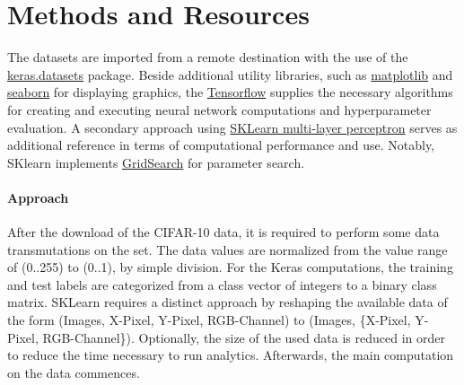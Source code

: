 \chapter{Methods and Resources}
The datasets are imported from a remote destination with the use of the \href{https://keras.io/api/datasets/cifar10/}{keras.datasets} package.
Beside additional utility libraries, such as \href{https://matplotlib.org/}{matplotlib} and \href{https://seaborn.pydata.org/}{seaborn} for displaying graphics, the \href{https://www.tensorflow.org/}{Tensorflow} supplies the necessary algorithms for creating and executing neural network computations and hyperparameter evaluation.
A secondary approach using \href{https://scikit-learn.org/stable/modules/generated/sklearn.neural_network.MLPClassifier.html}{SKLearn multi-layer perceptron} serves as additional reference in terms of computational performance and use. Notably, SKlearn implements \href{https://scikit-learn.org/stable/modules/generated/sklearn.model_selection.GridSearchCV.html}{GridSearch} for parameter search.

\subsubsection{Approach}
After the download of the CIFAR-10 data, it is required to perform some data transmutations on the set.
The data values are normalized from the value range of (0..255) to (0..1), by simple division. 
For the Keras computations, the training and test labels are categorized from a class vector of integers to a binary class matrix.
SKLearn requires a distinct approach by reshaping the available data of the form (Images, X-Pixel, Y-Pixel, RGB-Channel) to (Images, \{X-Pixel, Y-Pixel, RGB-Channel\}).
Optionally, the size of the used data is reduced in order to reduce the time necessary to run analytics.
Afterwards, the main computation on the data commences.
